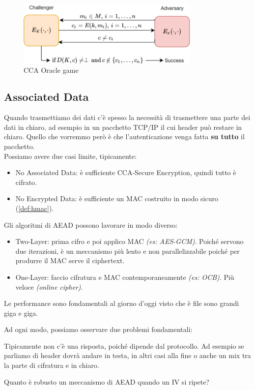 \begin{figure}[h]
    \centering
    \includegraphics[width=0.8\textwidth]{image/cca.png}
    \caption{CCA Oracle game}
    \label{fig:ciphertextoracle}
\end{figure}\pagebreak
\subsection{Associated Data}
Quando trasmettiamo dei dati c'è spesso la necessità di trasmettere una parte dei dati in chiaro, ad esempio in un pacchetto TCP/IP il cui header può restare in chiaro. Quello che vorremmo però è che l'autenticazione venga fatta \textbf{su tutto} il pacchetto.\\
Possiamo avere due casi limite, tipicamente:
\begin{itemize}
    \item No Associated Data: è sufficiente CCA-Secure Encryption, quindi tutto è cifrato.
    \item No Encrypted Data: è sufficiente un MAC costruito in modo sicuro (\cref{def:hmac}). 
\end{itemize}
Gli algoritmi di AEAD possono lavorare in modo diverso:
\begin{itemize}
    \item Two-Layer: prima cifro e poi applico MAC \textit{(es: AES-GCM)}.  Poiché servono due iterazioni, è un meccanismo più lento e non parallelizzabile poiché per produrre il MAC serve il ciphertext.
    \item One-Layer: faccio cifratura e MAC contemporaneamente \textit{(es: OCB)}. Più veloce \textit{(online cipher)}.
\end{itemize}
\begin{note}
Le performance sono fondamentali al giorno d'oggi visto che è file sono grandi giga e giga. 
\end{note}
Ad ogni modo, possiamo osservare due problemi fondamentali:
\begin{problem}Tipicamente non c'è una risposta, poiché dipende dal protocollo. Ad esempio se parliamo di header dovrà andare in testa, in altri casi alla fine o anche un mix tra la parte di cifratura e in chiaro. 
\end{problem}
\begin{problem}
Quanto è robusto un meccanismo di AEAD quando un IV si ripete?
\end{problem}
\vspace{-5mm}

